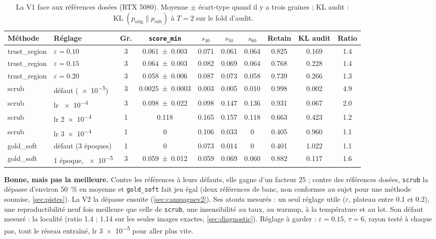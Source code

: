 \documentclass[11pt,a4paper]{article}
\newcommand{\KL}{\operatorname{KL}}
\newcommand{\orig}{\mathrm{orig}}
\newcommand{\sub}{\mathrm{sub}}
\newcommand{\code}[1]{\texttt{#1}}
\begin{document}
\begin{table}[ht]
  \centering\small
  \caption{La V1 face aux références dosées (RTX 5080). Moyenne $\pm$ écart-type quand il y a trois
  graines ; KL audit : $\KL(p_\orig\|p_\sub)$ à $T=2$ sur le fold d'audit.}
  \label{tab:refs}
  \setlength{\tabcolsep}{3.6pt}
  \begin{tabular}{@{}llc c SSS S S S[table-format=1.1]@{}}
    \toprule
    Méthode & Réglage & Gr. & {\code{score\_min}} & {$s_{40}$} & {$s_{50}$} & {$s_{60}$} & {Retain}
      & {KL audit} & {Ratio}\\
    \midrule
    trust\_region & $\varepsilon=\num{0.10}$ & 3 & \num{0.061 +- 0.003} & 0.071 & 0.061 & 0.064 & 0.825 & 0.169 & 1.4\\
    trust\_region & $\varepsilon=\num{0.15}$ & 3 & \num{0.064 +- 0.003} & 0.082 & 0.069 & 0.064 & 0.768 & 0.228 & 1.4\\
    trust\_region & $\varepsilon=\num{0.20}$ & 3 & \num{0.058 +- 0.006} & 0.087 & 0.073 & 0.058 & 0.739 & 0.266 & 1.3\\
    \midrule
    scrub & défaut (\num{e-5}) & 3 & \num{0.0025 +- 0.0003} & 0.003 & 0.005 & 0.010 & 0.998 & 0.002 & 4.9\\
    scrub & lr \num{e-4} & 3 & \num{0.098 +- 0.022} & 0.098 & 0.147 & 0.136 & 0.931 & 0.067 & 2.0\\
    scrub & lr \num{2e-4} & 1 & \num{0.118} & 0.165 & 0.157 & 0.118 & 0.663 & 0.423 & 1.2\\
    scrub & lr \num{3e-4} & 1 & 0 & 0.106 & 0.033 & 0 & 0.405 & 0.960 & 1.1\\
    \midrule
    gold\_soft & défaut (3 époques) & 1 & 0 & 0.073 & 0.014 & 0 & 0.401 & 1.022 & 1.1\\
    gold\_soft & 1 époque, \num{e-5} & 3 & \num{0.059 +- 0.012} & 0.059 & 0.069 & 0.060 & 0.882 & 0.117 & 1.6\\
    \bottomrule
  \end{tabular}
\end{table}

\begin{retenir}[Verdict sur la V1 de \code{trust\_region}]
\textbf{Bonne, mais pas la meilleure.} Contre les références à leurs défauts, elle gagne d'un
facteur 25 ; contre des références dosées, \code{scrub} la dépasse d'environ \SI{50}{\percent} en
moyenne et \code{gold\_soft} fait jeu égal (deux références de banc, non conformes au sujet pour
une méthode soumise, \cref{sec:pistes}). La V2 la dépasse ensuite (\cref{sec:campagnev2}). Ses atouts mesurés : un seul réglage utile ($\varepsilon$,
plateau entre \num{0.1} et \num{0.2}), une reproductibilité neuf fois meilleure que celle de
\code{scrub}, une insensibilité au taux, au warmup, à la température et au lot. Son défaut
mesuré : la localité (ratio \num{1.4} ; \num{1.14} sur les seules images exactes,
\cref{sec:diagnostic}). Réglage à garder : $\varepsilon=\num{0.15}$, $\tau=6$,
rayon testé à chaque pas, tout le réseau entraîné, lr \num{3e-5} pour aller plus vite.
\end{retenir}
\end{document}
